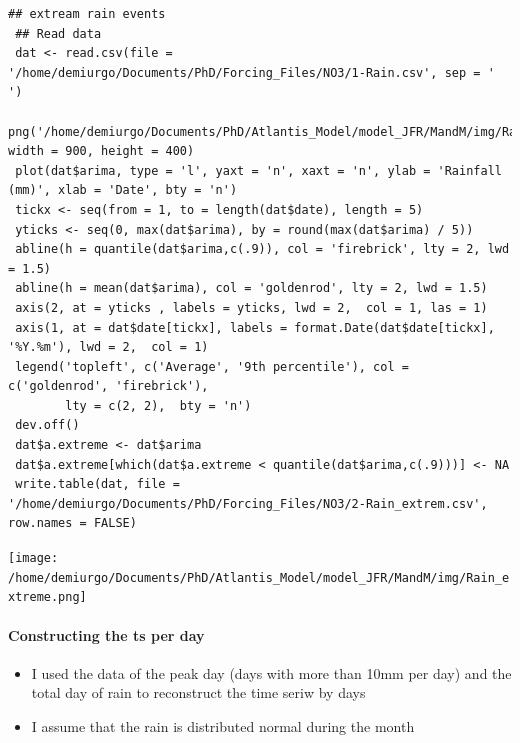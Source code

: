 \documentclass[11pt]{article}
\begin{document}
\begin{verbatim}
## extream rain events
 ## Read data
 dat <- read.csv(file = '/home/demiurgo/Documents/PhD/Forcing_Files/NO3/1-Rain.csv', sep = ' ')
 png('/home/demiurgo/Documents/PhD/Atlantis_Model/model_JFR/MandM/img/Rain_extreme.png', width = 900, height = 400)
 plot(dat$arima, type = 'l', yaxt = 'n', xaxt = 'n', ylab = 'Rainfall (mm)', xlab = 'Date', bty = 'n')
 tickx <- seq(from = 1, to = length(dat$date), length = 5)
 yticks <- seq(0, max(dat$arima), by = round(max(dat$arima) / 5))
 abline(h = quantile(dat$arima,c(.9)), col = 'firebrick', lty = 2, lwd = 1.5)
 abline(h = mean(dat$arima), col = 'goldenrod', lty = 2, lwd = 1.5)
 axis(2, at = yticks , labels = yticks, lwd = 2,  col = 1, las = 1)
 axis(1, at = dat$date[tickx], labels = format.Date(dat$date[tickx], '%Y.%m'), lwd = 2,  col = 1)
 legend('topleft', c('Average', '9th percentile'), col = c('goldenrod', 'firebrick'),
        lty = c(2, 2),  bty = 'n')
 dev.off()
 dat$a.extreme <- dat$arima
 dat$a.extreme[which(dat$a.extreme < quantile(dat$arima,c(.9)))] <- NA
 write.table(dat, file = '/home/demiurgo/Documents/PhD/Forcing_Files/NO3/2-Rain_extrem.csv', row.names = FALSE)
\end{verbatim}
     \texttt{[image: /home/demiurgo/Documents/PhD/Atlantis\_Model/model\_JFR/MandM/img/Rain\_extreme.png]}
\paragraph*{Constructing the ts per day}
\label{sec-5-3-1-3}

\begin{itemize}
\item I used the data of the peak day (days with more than 10mm per day) and the total day of rain to reconstruct the time seriw by days
\item I assume that the rain is distributed normal during the month
\end{itemize}
\end{document}
